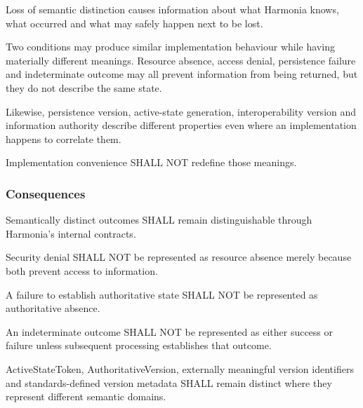 Loss of semantic distinction causes information about what Harmonia knows, what occurred and what may safely happen next to be lost.

\label{rad:axioms:679}

Two conditions may produce similar implementation behaviour while having materially different meanings. Resource absence, access denial, persistence failure and indeterminate outcome may all prevent information from being returned, but they do not describe the same state.

\label{rad:axioms:681}

Likewise, persistence version, active-state generation, interoperability version and information authority describe different properties even where an implementation happens to correlate them.

\label{rad:axioms:683}

Implementation convenience SHALL NOT redefine those meanings.

\label{rad:axioms:685}
\subsubsection*{Consequences}
\label{rad:axioms:686}

Semantically distinct outcomes SHALL remain distinguishable through Harmonia's internal contracts.

\label{rad:axioms:688}

Security denial SHALL NOT be represented as resource absence merely because both prevent access to information.

\label{rad:axioms:690}

A failure to establish authoritative state SHALL NOT be represented as authoritative absence.

\label{rad:axioms:692}

An indeterminate outcome SHALL NOT be represented as either success or failure unless subsequent processing establishes that outcome.

\label{rad:axioms:694}

ActiveStateToken, AuthoritativeVersion, externally meaningful version identifiers and standards-defined version metadata SHALL remain distinct where they represent different semantic domains.

\label{rad:axioms:696}

